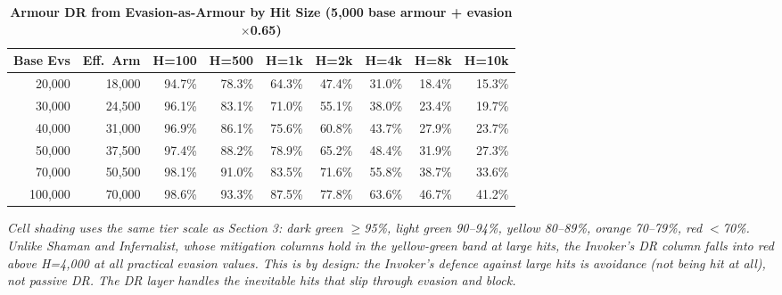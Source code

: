 \documentclass[12pt, letterpaper]{article}
\begin{document}
\begin{table}[htbp]
\centering
\caption{\textbf{Armour DR from Evasion-as-Armour by Hit Size (5{,}000 base armour + evasion$\times$0.65)}}
{\small
\begin{tabular}{rrrrrrrrr}
\toprule
\textbf{Base Evs} & \textbf{Eff.\ Arm} & \textbf{H=100} & \textbf{H=500} & \textbf{H=1k} & \textbf{H=2k} & \textbf{H=4k} & \textbf{H=8k} & \textbf{H=10k} \\
\midrule
\rowcolor{rowalt} 20{,}000 & 18{,}000 & \cellcolor{tierA}94.7\% & \cellcolor{tierC}78.3\% & \cellcolor{tierD}64.3\% & \cellcolor{tierD}47.4\% & \cellcolor{tierD}31.0\% & \cellcolor{tierD}18.4\% & \cellcolor{tierD}15.3\% \\
30{,}000 & 24{,}500 & \cellcolor{tierS}96.1\% & \cellcolor{tierB}83.1\% & \cellcolor{tierC}71.0\% & \cellcolor{tierD}55.1\% & \cellcolor{tierD}38.0\% & \cellcolor{tierD}23.4\% & \cellcolor{tierD}19.7\% \\
\rowcolor{rowalt} 40{,}000 & 31{,}000 & \cellcolor{tierS}96.9\% & \cellcolor{tierB}86.1\% & \cellcolor{tierC}75.6\% & \cellcolor{tierD}60.8\% & \cellcolor{tierD}43.7\% & \cellcolor{tierD}27.9\% & \cellcolor{tierD}23.7\% \\
50{,}000 & 37{,}500 & \cellcolor{tierS}97.4\% & \cellcolor{tierB}88.2\% & \cellcolor{tierB}78.9\% & \cellcolor{tierC}65.2\% & \cellcolor{tierD}48.4\% & \cellcolor{tierD}31.9\% & \cellcolor{tierD}27.3\% \\
\rowcolor{rowalt} 70{,}000 & 50{,}500 & \cellcolor{tierS}98.1\% & \cellcolor{tierA}91.0\% & \cellcolor{tierB}83.5\% & \cellcolor{tierC}71.6\% & \cellcolor{tierD}55.8\% & \cellcolor{tierD}38.7\% & \cellcolor{tierD}33.6\% \\
\rowcolor{rowhi} 100{,}000 & 70{,}000 & \cellcolor{tierS}98.6\% & \cellcolor{tierA}93.3\% & \cellcolor{tierB}87.5\% & \cellcolor{tierC}77.8\% & \cellcolor{tierC}63.6\% & \cellcolor{tierD}46.7\% & \cellcolor{tierD}41.2\% \\
\bottomrule
\end{tabular}
}
\smallskip
\begin{minipage}{\linewidth}
\small\textit{Cell shading uses the same tier scale as Section 3: dark green $\geq$95\%, light green 90--94\%, yellow 80--89\%, orange 70--79\%, red $<$70\%. Unlike Shaman and Infernalist, whose mitigation columns hold in the yellow-green band at large hits, the Invoker's DR column falls into red above H=4{,}000 at all practical evasion values. This is by design: the Invoker's defence against large hits is avoidance (not being hit at all), not passive DR. The DR layer handles the inevitable hits that slip through evasion and block.}
\end{minipage}
\end{table}
\end{document}
